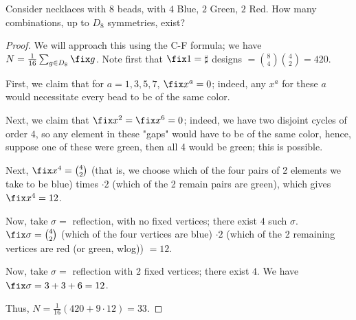 \documentclass[12pt,oneside]{article}
\begin{document}
\begin{example}
  Consider necklaces with $8$ beads, with $4$ Blue, $2$ Green, $2$ Red. How many combinations, up to $D_8$ symmetries, exist?
  \begin{proof}
    We will approach this using the C-F formula; we have $N = \frac{1}{16} \sum_{g \in D_8} \fix g$. Note first that $\fix 1 = \sharp $ designs $={8 \choose 4}{4 \choose 2} = 420$.

    First, we claim that for $a = 1, 3, 5, 7$, $\fix x^a = 0$; indeed, any $x^a$ for these $a$ would necessitate every bead to be of the same color.

    Next, we claim that $\fix x^2 = \fix x^6 = 0$; indeed, we have two disjoint cycles of order $4$, so any element in these "gaps" would have to be of the same color, hence, suppose one of these were green, then all 4 would be green; this is possible.

    Next, $\fix x^4 = {4 \choose 2}$ (that is, we choose which of the four pairs of 2 elements we take to be blue) times $\cdot 2$ (which of the 2 remain pairs are green), which gives $\fix x^4 = 12$.

    Now, take $\sigma = $ reflection, with no fixed vertices; there exist $4$ such $\sigma$. $\fix \sigma = {4 \choose 2}$ (which of the four vertices are blue) $\cdot 2$ (which of the 2 remaining vertices are red (or green, wlog)) $ = 12$.

    Now, take $\sigma = $ reflection with 2 fixed vertices; there exist $4$. We have $\fix \sigma = 3 + 3 + 6 = 12$.

    Thus, $N = \frac{1}{16}(420 + 9 \cdot 12) = 33$.
  \end{proof}
\end{example}



































\end{document}
